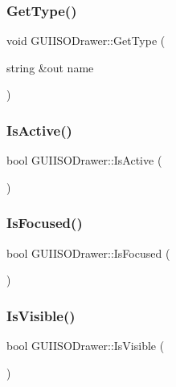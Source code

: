 \subsubsection{\texorpdfstring{Get\+Type()}{GetType()}}
{\footnotesize\ttfamily void G\+U\+I\+I\+S\+O\+Drawer\+::\+Get\+Type (\begin{DoxyParamCaption}\item[{string \&out}]{name }\end{DoxyParamCaption})}

\hypertarget{class_g_u_i_i_s_o_drawer_aca4e2ee8ae44ed6e762510c06d994c86}{}\label{class_g_u_i_i_s_o_drawer_aca4e2ee8ae44ed6e762510c06d994c86} 
\subsubsection{\texorpdfstring{Is\+Active()}{IsActive()}}
{\footnotesize\ttfamily bool G\+U\+I\+I\+S\+O\+Drawer\+::\+Is\+Active (\begin{DoxyParamCaption}{ }\end{DoxyParamCaption})}

\hypertarget{class_g_u_i_i_s_o_drawer_adcef078556671c49e36376d197aba9e5}{}\label{class_g_u_i_i_s_o_drawer_adcef078556671c49e36376d197aba9e5} 
\subsubsection{\texorpdfstring{Is\+Focused()}{IsFocused()}}
{\footnotesize\ttfamily bool G\+U\+I\+I\+S\+O\+Drawer\+::\+Is\+Focused (\begin{DoxyParamCaption}{ }\end{DoxyParamCaption})}

\hypertarget{class_g_u_i_i_s_o_drawer_ab9945ad04dcba7babf8c0ea022dcf8fc}{}\label{class_g_u_i_i_s_o_drawer_ab9945ad04dcba7babf8c0ea022dcf8fc} 
\subsubsection{\texorpdfstring{Is\+Visible()}{IsVisible()}}
{\footnotesize\ttfamily bool G\+U\+I\+I\+S\+O\+Drawer\+::\+Is\+Visible (\begin{DoxyParamCaption}{ }\end{DoxyParamCaption})}

